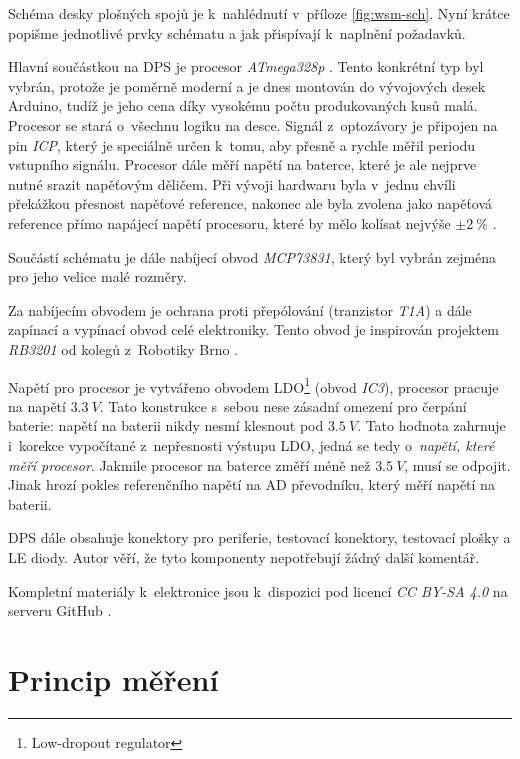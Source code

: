 Schéma desky plošných spojů je k~nahlédnutí v~příloze \ref{fig:wsm-sch}. Nyní
krátce popišme jednotlivé prvky schématu a jak přispívají k~naplnění požadavků.

Hlavní součástkou na DPS je procesor \textit{ATmega328p}
\cite{atmega328p:datasheet}.  Tento konkrétní typ byl vybrán, protože je
poměrně moderní a je dnes montován do vývojových desek Arduino, tudíž je jeho
cena díky vysokému počtu produkovaných kusů malá. Procesor se stará o~všechnu
logiku na desce.  Signál z~optozávory je připojen na pin \textit{ICP}, který je
speciálně určen k~tomu, aby přesně a rychle měřil periodu vstupního signálu.
Procesor dále měří napětí na baterce, které je ale nejprve nutné srazit
napěťovým děličem. Při vývoji hardwaru byla v~jednu chvíli překážkou přesnost
napěťové reference, nakonec ale byla zvolena jako napěťová reference přímo
napájecí napětí procesoru, které by mělo kolísat nejvýše $\pm 2\ \%$
\cite{ldo:datasheet}.

Součástí schématu je dále nabíjecí obvod \textit{MCP73831}, který byl vybrán
zejména pro jeho velice malé rozměry.

Za nabíjecím obvodem je ochrana proti přepólování (tranzistor \textit{T1A}) a
dále zapínací a vypínací obvod celé elektroniky. Tento obvod je inspirován
projektem \textit{RB3201} \cite{rb3201} od kolegů z~Robotiky Brno
\cite{roboticsbrno}.

Napětí pro procesor je vytvářeno obvodem LDO\footnote{Low-dropout regulator}
(obvod \textit{IC3}), procesor pracuje na napětí $3.3\ V$. Tato konstrukce
s~sebou nese zásadní omezení pro čerpání baterie: napětí na baterii nikdy nesmí
klesnout pod $3.5\ V$. Tato hodnota zahrnuje i~korekce vypočítané z~nepřesnosti
výstupu LDO, jedná se tedy o~\textit{napětí, které měří procesor}. Jakmile
procesor na baterce změří méně než $3.5\ V$, musí se odpojit. Jinak hrozí
pokles referenčního napětí na AD převodníku, který měří napětí na baterii.

DPS dále obsahuje konektory pro periferie, testovací konektory, testovací
plošky a LE diody. Autor věří, že tyto komponenty nepotřebují žádný další
komentář.

Kompletní materiály k~elektronice jsou k~dispozici pod licencí \textit{CC BY-SA
4.0} na serveru GitHub \cite{wsm-pcb}.

\section{Princip měření}
\label{sec:wsm-mer-princip}

